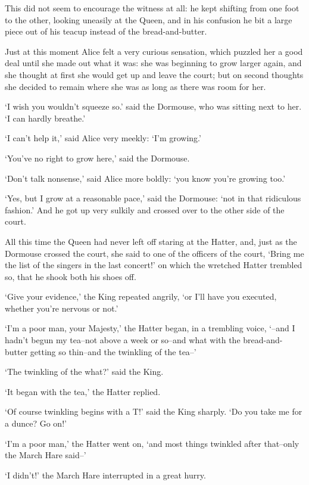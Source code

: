   This did not seem to encourage the witness at all:  he kept
shifting from one foot to the other, looking uneasily at the
Queen, and in his confusion he bit a large piece out of his
teacup instead of the bread-and-butter.

  Just at this moment Alice felt a very curious sensation, which
puzzled her a good deal until she made out what it was:  she was
beginning to grow larger again, and she thought at first she
would get up and leave the court; but on second thoughts she
decided to remain where she was as long as there was room for
her.

  `I wish you wouldn't squeeze so.' said the Dormouse, who was
sitting next to her.  `I can hardly breathe.'

  `I can't help it,' said Alice very meekly:  `I'm growing.'

  `You've no right to grow here,' said the Dormouse.

  `Don't talk nonsense,' said Alice more boldly:  `you know
you're growing too.'

  `Yes, but I grow at a reasonable pace,' said the Dormouse:
`not in that ridiculous fashion.'  And he got up very sulkily
and crossed over to the other side of the court.

  All this time the Queen had never left off staring at the
Hatter, and, just as the Dormouse crossed the court, she said to
one of the officers of the court, `Bring me the list of the
singers in the last concert!' on which the wretched Hatter
trembled so, that he shook both his shoes off.

  `Give your evidence,' the King repeated angrily, `or I'll have
you executed, whether you're nervous or not.'

  `I'm a poor man, your Majesty,' the Hatter began, in a
trembling voice, `--and I hadn't begun my tea--not above a week
or so--and what with the bread-and-butter getting so thin--and
the twinkling of the tea--'

  `The twinkling of the what?' said the King.

  `It began with the tea,' the Hatter replied.

  `Of course twinkling begins with a T!' said the King sharply.
`Do you take me for a dunce?  Go on!'

  `I'm a poor man,' the Hatter went on, `and most things
twinkled after that--only the March Hare said--'

  `I didn't!' the March Hare interrupted in a great hurry.

